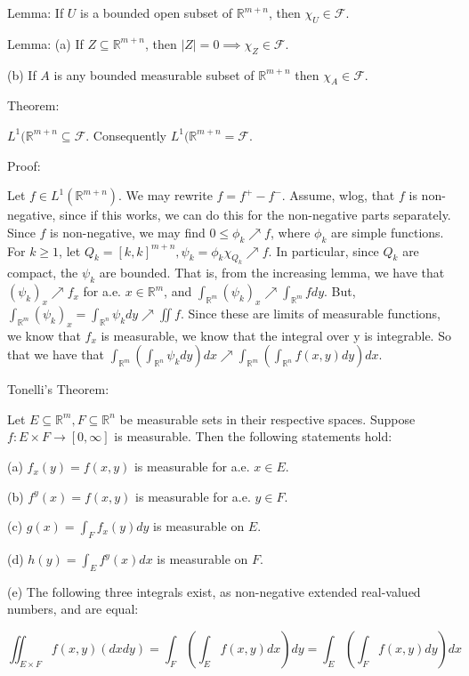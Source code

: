 \documentclass[10pt]{article}
\begin{document}
Lemma: If $U$ is a bounded open subset of $\mathbb{R}^{m+n}$, then $\chi_U \in \mathcal{F}$.

Lemma: (a) If $Z \subseteq \mathbb{R}^{m+n}$, then $|Z| = 0 \implies \chi_Z \in \mathcal{F}$.

(b) If $A$ is any bounded measurable subset of $\mathbb{R}^{m+n}$ then $\chi_A \in \mathcal{F}$.

Theorem:

$L^1(\mathbb{R}^{m+n} \subseteq \mathcal{F}$. Consequently $L^1(\mathbb{R}^{m+n} = \mathcal{F}$.

Proof:

Let $f \in L^1(\mathbb{R}^{m+n})$. We may rewrite $f = f^+ - f^-$. Assume, wlog, that $f$ is non-negative, since if this works, we can do this for the non-negative parts separately. Since $f$ is non-negative, we may find $0 \leq \phi_k \nearrow f$, where $\phi_k$ are simple functions. For $k \geq 1$, let $Q_k = [k,k]^{m+n}, \psi_k = \phi_k \chi_{Q_k} \nearrow f$. In particular, since $Q_k$ are compact, the $\psi_k$ are bounded. That is, from the increasing lemma, we have that $(\psi_k)_x \nearrow f_x$ for a.e. $ x\in \mathbb{R}^m$, and $\int_{\mathbb{R}^m} (\psi_k)_x \nearrow \int_{\mathbb{R}^m}  f dy$. But, $\int_{\mathbb{R}^m} (\psi_k)_x = \int_{\mathbb{R}^n} \psi_k dy \nearrow \iint f$. Since these are limits of measurable functions, we know that $f_x$ is measurable, we know that the integral over y is integrable. So that we have that $\int_{\mathbb{R}^m} ( \int_{\mathbb{R}^n} \psi_k dy) dx \nearrow  \int_{\mathbb{R}^m} ( \int_{\mathbb{R}^n} f(x,y) dy) dx $.

Tonelli’s Theorem:

Let $E \subseteq \mathbb{R}^m, F \subseteq \mathbb{R}^n$ be measurable sets in their respective spaces. Suppose $f: E \times F \to [0,\infty]$ is measurable. Then the following statements hold:

(a) $f_x(y) = f(x,y)$ is measurable for a.e. $x \in E$.

(b) $f^y(x) = f(x,y)$ is measurable for a.e. $y \in F$.

(c) $g(x) = \int_F f_x(y) dy$ is measurable on $E$.

(d) $h(y) = \int_E f^y(x) dx$ is measurable on $F$.

(e) The following three integrals exist, as non-negative extended real-valued numbers, and are equal:

$$ \iint_{E \times F}  f(x,y) (dxdy) = \int_F (\int_E f(x,y) dx) dy = \int_E (\int_F f(x,y) dy) dx$$
\end{document}
